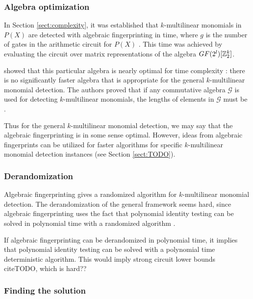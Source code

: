 \subsubsection{Algebra optimization}
\label{sect:algebra_is_optimal}

In Section \ref{sect:complexity}, it was established that $k$-multilinear monomials 
in $P(X)$ are detected with 
algebraic fingerprinting in  time, where 
$g$ is the number of gates in the arithmetic circuit for $P(X)$ \cite{Williams09}. 
This time was achieved by evaluating the circuit over matrix 
representations of the algebra $GF(2^l)[\mathbb Z_2^k]$.

\citeauthor{KouWil09} showed that this particular algebra is nearly optimal 
for time complexity \cite{KouWil09}: there is no significantly faster algebra that 
is appropriate for the general $k$-multilinear monomial detection. 
The authors proved that if any commutative algebra $\mathcal{G}$ is 
used for detecting $k$-multilinear monomials, 
the lengths of elements in $\mathcal{G}$ must be .

Thus for the general $k$-multilinear monomial detection, we may say 
that the algebraic fingerprinting is in some sense optimal. 
However, 
ideas from algebraic fingerprints can be utilized for faster algorithms for 
specific $k$-multilinear monomial detection instances (see Section \ref{sect:TODO}).

\subsubsection{Derandomization}

Algebraic fingerprinting gives a randomized algorithm for $k$-multilinear monomial detection. 
The derandomization of the general framework seems hard, since algebraic fingerprinting 
uses the fact that polynomial identity testing can be solved in polynomial time with 
a randomized algorithm \cite{Williams09}.

If algebraic fingerprinting can be derandomized 
in polynomial time, it implies that polynomial identity testing can be solved with a 
polynomial time deterministic algorithm. This would imply strong circuit lower bounds \\cite{TODO}, 
which is hard??

\subsubsection{Finding the solution}
\label{sect:finding_the_solution}

